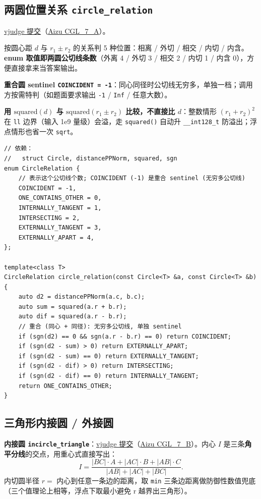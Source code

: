 		\subsection{两圆位置关系 \texttt{circle\_relation}}

		\href{https://vjudge.net/solution/69918813}{vjudge 提交}（\href{https://vjudge.net/problem/Aizu-CGL_7_A}{Aizu CGL\_7\_A}）。

		按圆心距 $d$ 与 $r_1 \pm r_2$ 的关系判 5 种位置：相离 / 外切 / 相交 / 内切 / 内含。\textbf{enum 取值即两圆公切线条数}（外离 4 / 外切 3 / 相交 2 / 内切 1 / 内含 0），方便直接拿来当答案输出。

		\textbf{重合圆 sentinel \texttt{COINCIDENT = -1}}：同心同径时公切线无穷多，单独一档；调用方按需特判（如题面要求输出 \texttt{-1} / \texttt{Inf} / 任意大数）。

		\textbf{用 $\mathrm{squared}(d)$ 与 $\mathrm{squared}(r_1 \pm r_2)$ 比较，不直接比 $d$}：整数情形 $(r_1 + r_2)^2$ 在 \texttt{ll} 边界（输入 1e9 量级）会溢，走 \texttt{squared()} 自动升 \texttt{\_\_int128\_t} 防溢出；浮点情形也省一次 \texttt{sqrt}。

		\begin{verbatim}
// 依赖：
//   struct Circle, distancePPNorm, squared, sgn
enum CircleRelation {
	// 表示这个公切线个数; COINCIDENT (-1) 是重合 sentinel (无穷多公切线)
	COINCIDENT = -1,
	ONE_CONTAINS_OTHER = 0,
	INTERNALLY_TANGENT = 1,
	INTERSECTING = 2,
	EXTERNALLY_TANGENT = 3,
	EXTERNALLY_APART = 4,
};

template<class T>
CircleRelation circle_relation(const Circle<T> &a, const Circle<T> &b) {
	auto d2 = distancePPNorm(a.c, b.c);
	auto sum = squared(a.r + b.r);
	auto dif = squared(a.r - b.r);
	// 重合 (同心 + 同径): 无穷多公切线, 单独 sentinel
	if (sgn(d2) == 0 && sgn(a.r - b.r) == 0) return COINCIDENT;
	if (sgn(d2 - sum) > 0) return EXTERNALLY_APART;
	if (sgn(d2 - sum) == 0) return EXTERNALLY_TANGENT;
	if (sgn(d2 - dif) > 0) return INTERSECTING;
	if (sgn(d2 - dif) == 0) return INTERNALLY_TANGENT;
	return ONE_CONTAINS_OTHER;
}
		\end{verbatim}

		\subsection{三角形内接圆 / 外接圆}

		\textbf{内接圆 \texttt{incircle\_triangle}}：\href{https://vjudge.net/solution/69920478}{vjudge 提交}（\href{https://vjudge.net/problem/Aizu-CGL_7_B}{Aizu CGL\_7\_B}）。内心 $I$ 是三条\textbf{角平分线}的交点，用重心式直接写出：
		$$I = \frac{|BC| \cdot A + |AC| \cdot B + |AB| \cdot C}{|AB| + |AC| + |BC|}.$$
		内切圆半径 $r = $ 内心到任意一条边的距离，取 \texttt{min} 三条边距离做防御性数值兜底（三个值理论上相等，浮点下取最小避免 r 越界出三角形）。

